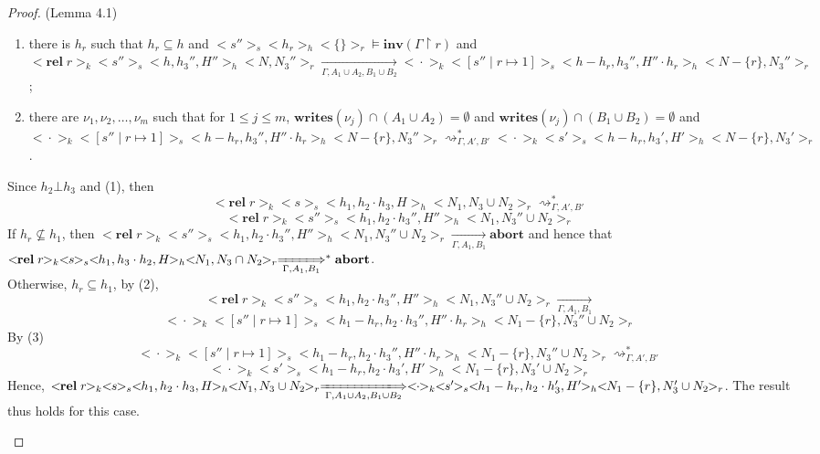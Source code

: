 \documentclass{lmcs} %
\theoremstyle{plain}\newtheorem{satz}[thm]{Satz} %
\begin{document}
\begin{proof}{(Lemma 4.1)}
\begin{itemize}
\begin{enumerate}
    \item there is $h_r$ such that $h_r \subseteq h$ and $<\!\!s''\!\!>_s<\!\!h_r\!\!>_h<\!\!\{\}\!\!>_r\models \mathbf{inv}(\Gamma\upharpoonright r)$ and $<\!\!\mathbf{rel}\;r\!\!>_k<\!\!s''\!\!>_s<\!\!h,h_3'',H''\!\!>_h<\!\!N,N_3''\!\!>_r\xrightarrow[\Gamma, A_1\cup A_2,B_1\cup B_2]{}<\!\!\cdot\!\!>_k<\!\![s''\mid r\mapsto 1]\!\!>_s<\!\!h-h_r,h_3'',H''\cdot h_r\!\!>_h<\!\!N-\{r\},N_3''\!\!>_r$;
    \item there are $\nu_1,\nu_2,\ldots,\nu_m$ such that for $1\leq j\leq m$, $\mathbf{writes}(\nu_j)\cap (A_1\cup A_2) =\emptyset$ and $\mathbf{writes}(\nu_j)\cap (B_1\cup B_2) =\emptyset$ and $<\!\!\cdot\!\!>_k<\!\![s''\mid r\mapsto 1]\!\!>_s<\!\!h-h_r,h_3'',H''\cdot h_r\!\!>_h<\!\!N-\{r\},N_3''\!\!>_r\rightsquigarrow_{\Gamma, A' ,B'}^*<\!\!\cdot\!\!>_k<\!\!s'\!\!>_s<\!\!h-h_r,h_3',H'\!\!>_h<\!\!N-\{r\},N_3'\!\!>_r$.
  \end{enumerate}
  Since $h_2\bot h_3$ and (1), then
  $$<\!\!\mathbf{rel}\;r\!\!>_k<\!\!s\!\!>_s<\!\!h_1,h_2\cdot h_3,H\!\!>_h<\!\!N_1,N_3\cup N_2\!\!>_r\rightsquigarrow_{\Gamma, A' ,B'}^*$$
  $$<\!\!\mathbf{rel}\;r\!\!>_k<\!\!s''\!\!>_s<\!\!h_1,h_2\cdot h_3'',H''\!\!>_h<\!\!N_1,N_3''\cup N_2\!\!>_r$$
  If $h_r\nsubseteq h_1$, then
  $<\!\!\mathbf{rel}\;r\!\!>_k<\!\!s''\!\!>_s<\!\!h_1,h_2\cdot h_3'',H''\!\!>_h<\!\!N_1,N_3''\cup N_2\!\!>_r\xrightarrow[\Gamma, A_1,B_1]{}\mathbf{abort}$  and hence that $<\!\!\mathbf{rel}\;r\!\!>_k<\!\!s\!\!>_s<\!\!h_1,h_3\cdot h_2,H\!\!>_h<\!\!N_1,N_3\cap N_2\!\!>_r\xLongrightarrow[\Gamma, A_1,B_1]{}^*\mathbf{abort}$.\\
  Otherwise, $h_r\subseteq h_1$, by (2),
  $$<\!\!\mathbf{rel}\;r\!\!>_k<\!\!s''\!\!>_s<\!\!h_1,h_2\cdot h_3'',H''\!\!>_h<\!\!N_1,N_3''\cup N_2\!\!>_r\xrightarrow[\Gamma, A_1,B_1]{}$$
  $$<\!\!\cdot\!\!>_k<\!\![s''\mid r\mapsto 1]\!\!>_s<\!\!h_1-h_r,h_2\cdot h_3'',H''\cdot h_r\!\!>_h<\!\!N_1-\{r\},N_3''\cup N_2\!\!>_r$$
  By (3)
  $$<\!\!\cdot\!\!>_k<\!\![s''\mid r\mapsto 1]\!\!>_s<\!\!h_1-h_r,h_2\cdot h_3'',H''\cdot h_r\!\!>_h<\!\!N_1-\{r\},N_3''\cup N_2\!\!>_r\rightsquigarrow_{\Gamma, A' ,B'}^*$$
  $$<\!\!\cdot\!\!>_k<\!\!s'\!\!>_s<\!\!h_1-h_r,h_2\cdot h_3',H'\!\!>_h<\!\!N_1-\{r\},N_3'\cup N_2\!\!>_r$$
  Hence, $<\!\!\mathbf{rel}\;r\!\!>_k<\!\!s\!\!>_s<\!\!h_1,h_2\cdot h_3,H\!\!>_h<\!\!N_1,N_3\cup N_2\!\!>_r\xLongrightarrow[\Gamma, A_1\cup A_2, B_1\cup B_2]{}<\!\!\cdot\!\!>_k<\!\!s'\!\!>_s<\!\!h_1-h_r,h_2\cdot h_3',H'\!\!>_h<\!\!N_1-\{r\},N_3'\cup N_2\!\!>_r$. The result thus holds for this case.
\end{itemize}
\end{proof}
\end{document}
